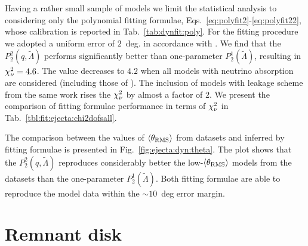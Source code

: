 %
Having a rather small sample of models we limit the statistical analysis to considering 
only the polynomial fitting formulae, Eqs.~\eqref{eq:polyfit2}-\eqref{eq:polyfit22}, whose 
calibration is reported in Tab.~\ref{tab:dynfit:poly}. 
%
For the fitting procedure we adopted a uniform error of $2$~deg. in accordance with
\citet{Radice:2018pdn}.
%
We find that the $P_2^2(q,\tilde\Lambda)$ performs significantly better than one-parameter 
$P_2^1(\tilde\Lambda)$, resulting in $\chi_{\nu}^2=4.6$. The value decreases to $4.2$ when 
all models with neutrino absorption are considered (including those of \citet{Radice:2018pdn}).
The inclusion of models with leakage scheme from the same work rises the $\chi_{\nu}^2$ by almost 
a factor of $2$. 
We present the comparison of fitting formulae performance in terms of $\chi_{\nu}^2$ in 
Tab.~\ref{tbl:fit:ejecta:chi2dofsall}.

The comparison between the values of $\langle\theta_{\rm RMS}\rangle$ from datasets and inferred by 
fitting formulae is presented in Fig.~\ref{fig:ejecta:dyn:theta}.
The plot shows that the $P_2^2(q,\tilde{\Lambda})$ reproduces considerably better 
the low-$\langle\theta_{\rm RMS}\rangle$ models from the datasets than the one-parameter $P_2^1(\tilde{\Lambda})$.
Both fitting formulae are able to reproduce the model data within the $\sim 10$~deg
error margin.
%


\section{Remnant disk}
\label{sec:stat:remdisk}

